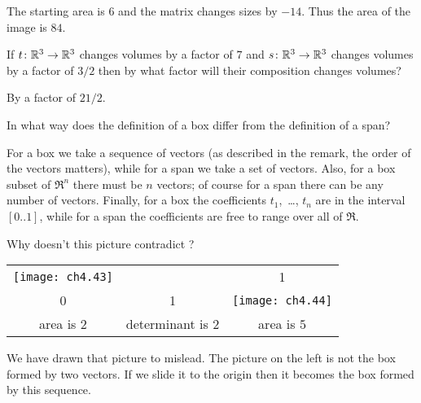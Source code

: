 \begin{exercises}
\begin{answer}
      The starting area is \( 6 \) and the matrix changes sizes by
      \( -14 \).
      Thus the area of the image is \( 84 \).  
    \end{answer}
  \item
     If \( \mbox{$t\colon \mathbb{R}^3\to \mathbb{R}^3$} \) changes volumes by a factor of \( 7 \)
     and \( \mbox{$s\colon \mathbb{R}^3\to \mathbb{R}^3$} \) changes volumes by a factor of \( 3/2 \)
     then by what factor will their composition changes volumes?
     \begin{answer}
        By a factor of \( 21/2 \).
     \end{answer}
  \item 
    In what way does the definition of a box differ from the
    definition of a span?
    \begin{answer}
      For a box we take a sequence of vectors (as described
      in the remark, the order of the vectors matters),
      while for a span we take a set of vectors.
      Also, for a box subset of $\Re^n$ there must be $n$ vectors; 
      of course for a span there can be any number of vectors.
      Finally, for a box the coefficients $t_1$,~\ldots, $t_n$
      are in the interval $[0..1]$, while for a 
      span the coefficients are free to range over all of $\Re$. 
    \end{answer}
  \recommended \item 
    Why doesn't this picture contradict
    ?
    \begin{center}
      \begin{tabular}{ccc}
        \texttt{[image: ch4.43]}
        &\raisebox{12pt}{\( \grstep{\bigl(\begin{smallmatrix}
                                        2  &1 \\
                                        0  &1
                                     \end{smallmatrix}\bigr)} \)}
        &\texttt{[image: ch4.44]}                                 \\
        area is $2$
        &determinant is $2$
        &area is $5$
      \end{tabular}
    \end{center}
    \begin{answer}
      We have drawn that picture to mislead.
      The picture on the left is not the box formed by two vectors.
      If we slide it to the origin then it becomes the box formed by
      this sequence.
      \begin{equation*}

\end{equation*}
\end{answer}
\end{exercises}
